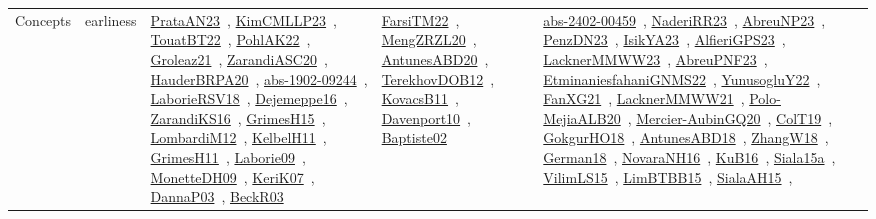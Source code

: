 {\begin{longtable}{lp{3cm}>{\raggedright\arraybackslash}p{6cm}>{\raggedright\arraybackslash}p{6cm}>{\raggedright\arraybackslash}p{8cm}}
Concepts & earliness & \href{works/PrataAN23.pdf}{PrataAN23}~\cite{PrataAN23}, \href{works/KimCMLLP23.pdf}{KimCMLLP23}~\cite{KimCMLLP23}, \href{works/TouatBT22.pdf}{TouatBT22}~\cite{TouatBT22}, \href{works/PohlAK22.pdf}{PohlAK22}~\cite{PohlAK22}, \href{works/Groleaz21.pdf}{Groleaz21}~\cite{Groleaz21}, \href{works/ZarandiASC20.pdf}{ZarandiASC20}~\cite{ZarandiASC20}, \href{works/HauderBRPA20.pdf}{HauderBRPA20}~\cite{HauderBRPA20}, \href{works/abs-1902-09244.pdf}{abs-1902-09244}~\cite{abs-1902-09244}, \href{works/LaborieRSV18.pdf}{LaborieRSV18}~\cite{LaborieRSV18}, \href{works/Dejemeppe16.pdf}{Dejemeppe16}~\cite{Dejemeppe16}, \href{works/ZarandiKS16.pdf}{ZarandiKS16}~\cite{ZarandiKS16}, \href{works/GrimesH15.pdf}{GrimesH15}~\cite{GrimesH15}, \href{works/LombardiM12.pdf}{LombardiM12}~\cite{LombardiM12}, \href{works/KelbelH11.pdf}{KelbelH11}~\cite{KelbelH11}, \href{works/GrimesH11.pdf}{GrimesH11}~\cite{GrimesH11}, \href{works/Laborie09.pdf}{Laborie09}~\cite{Laborie09}, \href{works/MonetteDH09.pdf}{MonetteDH09}~\cite{MonetteDH09}, \href{works/KeriK07.pdf}{KeriK07}~\cite{KeriK07}, \href{works/DannaP03.pdf}{DannaP03}~\cite{DannaP03}, \href{works/BeckR03.pdf}{BeckR03}~\cite{BeckR03} & \href{works/FarsiTM22.pdf}{FarsiTM22}~\cite{FarsiTM22}, \href{works/MengZRZL20.pdf}{MengZRZL20}~\cite{MengZRZL20}, \href{works/AntunesABD20.pdf}{AntunesABD20}~\cite{AntunesABD20}, \href{works/TerekhovDOB12.pdf}{TerekhovDOB12}~\cite{TerekhovDOB12}, \href{works/KovacsB11.pdf}{KovacsB11}~\cite{KovacsB11}, \href{works/Davenport10.pdf}{Davenport10}~\cite{Davenport10}, \href{works/Baptiste02.pdf}{Baptiste02}~\cite{Baptiste02} & \href{works/abs-2402-00459.pdf}{abs-2402-00459}~\cite{abs-2402-00459}, \href{works/NaderiRR23.pdf}{NaderiRR23}~\cite{NaderiRR23}, \href{works/AbreuNP23.pdf}{AbreuNP23}~\cite{AbreuNP23}, \href{works/PenzDN23.pdf}{PenzDN23}~\cite{PenzDN23}, \href{works/IsikYA23.pdf}{IsikYA23}~\cite{IsikYA23}, \href{works/AlfieriGPS23.pdf}{AlfieriGPS23}~\cite{AlfieriGPS23}, \href{works/LacknerMMWW23.pdf}{LacknerMMWW23}~\cite{LacknerMMWW23}, \href{works/AbreuPNF23.pdf}{AbreuPNF23}~\cite{AbreuPNF23}, \href{works/EtminaniesfahaniGNMS22.pdf}{EtminaniesfahaniGNMS22}~\cite{EtminaniesfahaniGNMS22}, \href{works/YunusogluY22.pdf}{YunusogluY22}~\cite{YunusogluY22}, \href{works/FanXG21.pdf}{FanXG21}~\cite{FanXG21}, \href{works/LacknerMMWW21.pdf}{LacknerMMWW21}~\cite{LacknerMMWW21}, \href{works/Polo-MejiaALB20.pdf}{Polo-MejiaALB20}~\cite{Polo-MejiaALB20}, \href{works/Mercier-AubinGQ20.pdf}{Mercier-AubinGQ20}~\cite{Mercier-AubinGQ20}, \href{works/ColT19.pdf}{ColT19}~\cite{ColT19}, \href{works/GokgurHO18.pdf}{GokgurHO18}~\cite{GokgurHO18}, \href{works/AntunesABD18.pdf}{AntunesABD18}~\cite{AntunesABD18}, \href{works/ZhangW18.pdf}{ZhangW18}~\cite{ZhangW18}, \href{works/German18.pdf}{German18}~\cite{German18}, \href{works/NovaraNH16.pdf}{NovaraNH16}~\cite{NovaraNH16}, \href{works/KuB16.pdf}{KuB16}~\cite{KuB16}, \href{works/Siala15a.pdf}{Siala15a}~\cite{Siala15a}, \href{works/VilimLS15.pdf}{VilimLS15}~\cite{VilimLS15}, \href{works/LimBTBB15.pdf}{LimBTBB15}~\cite{LimBTBB15}, \href{works/SialaAH15.pdf}{SialaAH15}~\cite{SialaAH15}, 
\end{longtable}}
